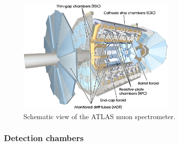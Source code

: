 \begin{figure}[!tb]
  \begin{center}
      \includegraphics[width=0.7\textwidth]{ATLASdetector/Figures/MuonSystem.eps}
  \end{center}
  \caption{Schematic view of the ATLAS muon spectrometer.}
  \label{fig:MuonSpectrometerSchema}
\end{figure}

\subsubsection{Detection chambers}

